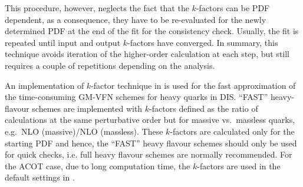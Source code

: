   This procedure, however, neglects the fact that the $k$-factors can be 
  PDF dependent, 
  as a consequence, they have to be re-evaluated
  for the newly determined PDF at the end of the fit for the consistency
  check. Usually, the fit is repeated until input and output
  $k$-factors have converged. In summary, this technique avoids
  iteration of the higher-order calculation at each step, but still
  requires a couple of repetitions depending on the analysis.


%
%

An implementation of $k$-factor technique in \fitter is used for the fast 
approximation of the time-consuming GM-VFN schemes for heavy quarks in DIS.
``FAST'' heavy-flavour schemes are implemented
with $k$-factors defined as the ratio of
calculations at the same perturbative order but for massive vs.\
massless quarks, e.g.\ NLO (massive)/NLO (massless).
These $k$-factors are calculated only for the
starting PDF and hence, the ``FAST'' heavy flavour schemes should
only be used for quick checks, i.e. full heavy flavour schemes
are normally recommended. For the ACOT case,
due to long computation time, the $k$-factors are used in 
the default settings in \fitter. 



